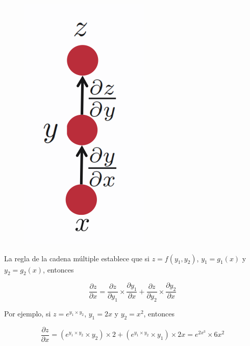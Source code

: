 \begin{figure}[htb]
	\centering
	 \includegraphics[scale=0.2]{pics/simple_chain_rule.png}
\end{figure}

La regla de la cadena múltiple establece que si $z = f(y_1,y_2)$, $y_1 = g_1(x)$ y $y_2 = g_2(x)$, entonces

\begin{displaymath}
\frac{\partial z}{\partial x} = \frac{\partial z}{\partial y_1} \times \frac{\partial y_1}{\partial x} + \frac{\partial z}{\partial y_2} \times \frac{\partial y_2}{\partial x}
\end{displaymath}

Por ejemplo, si $z= e^{y_1 \times y_2}$, $y_1 = 2x$ y $y_2 = x^2$, entonces

\begin{displaymath}
\frac{\partial z}{\partial x} = (e^{y_1 \times y_2}\times y_2) \times 2 + (e^{y_1 \times y_2}\times y_1) \times 2x = e^{2x^3} \times 6x^2
\end{displaymath}


